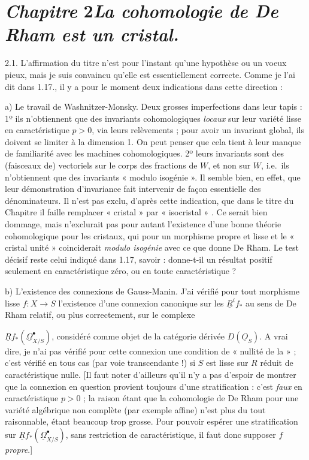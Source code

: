 \documentclass[11pt,a4paper]{article}
\begin{document}
\section*{\emph{Chapitre} 2\quad \emph{La cohomologie de De Rham est un cristal.}}

2.1. L'affirmation du titre n'est pour l'instant qu'une hypothèse ou un voeux
pieux, mais je suis convaincu qu'elle est essentiellement correcte. Comme je
l'ai dit dans 1.17., il y a pour le moment deux indications dans cette
direction :

a) Le travail de Washnitzer-Monsky. Deux grosses imperfections dans leur
tapis : 1º ils n'obtiennent que des invariants cohomologiques \emph{locaux} sur
leur variété lisse en caractéristique $p>0$, via leurs relèvements ; pour
avoir un invariant global, ils doivent se limiter à la dimension 1. On peut
penser que cela tient à leur manque de familiarité avec les machines
cohomologiques. 2º leurs invariants sont des (faisceaux de) vectoriels sur le
corps des fractions de $W$, et non sur $W$, i.e.\ ils n'obtiennent que des
invariants « modulo isogénie ». Il semble bien, en effet, que leur
démonstration d'invariance fait intervenir de façon essentielle des
dénominateurs. Il n'est pas exclu, d'après cette indication, que dans le titre
du Chapitre il faille remplacer « cristal » par « isocristal »
. Ce serait bien dommage, mais n'exclurait
pas pour autant l'existence d'une bonne théorie cohomologique pour les
cristaux, qui pour un morphisme propre et lisse et le « cristal unité »
coinciderait \emph{modulo isogénie} avec ce que donne De Rham. Le test décisif
reste celui indiqué dans 1.17, savoir : donne-t-il un résultat positif
seulement en caractéristique zéro, ou en toute caractéristique ?

b) L'existence des connexions de Gauss-Manin. J'ai vérifié pour tout
morphisme lisse $f\colon X\to S$ l'existence d'une connexion canonique
 sur les $\underline{R}^if_*$ au sens de De Rham relatif, ou
plus correctement, sur le complexe

$\underline{R}f_*(\underline{\Omega}^{\bullet}_{X/S})$, considéré comme objet
de la catégorie dérivée $D(\underline{O}_S)$. A vrai dire, je n'ai pas vérifié
pour cette connexion une condition de « nullité de la  » ;
c'est vérifié en tous cas (par voie transcendante !) si $S$ est lisse\add{,}
sur $R$ réduit de caractéristique nulle. [Il faut noter d'ailleurs qu'il n'y a pas d'espoir
de montrer que la connexion en question provient toujours d'une
stratification : c'est \emph{faux} en caractéristique $p>0$ ; la raison étant
que la cohomologie de De Rham pour une variété algébrique non complète (par
exemple affine) n'est plus du tout raisonnable, étant beaucoup trop grosse.
Pour pouvoir espérer une stratification sur
$\underline{R}f_*(\underline{\Omega}^{\bullet}_{X/S})$, sans restriction de
caractéristique, il faut donc supposer $f$ \emph{propre}.]
\end{document}
